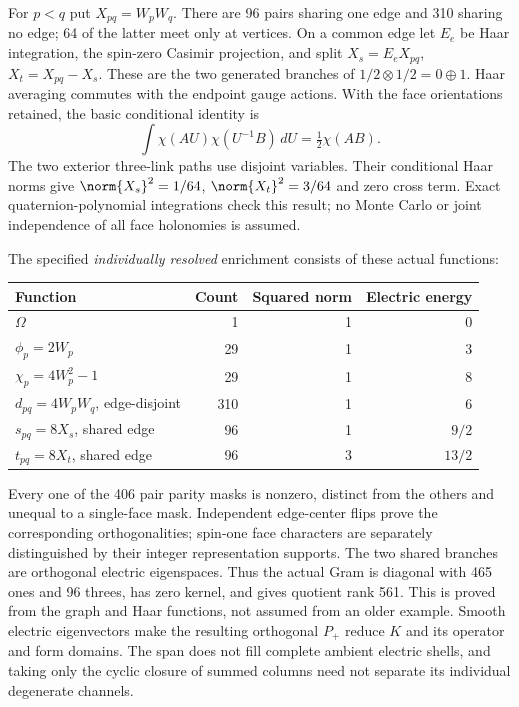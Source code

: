 For $p<q$ put $X_{pq}=W_pW_q$. There are 96 pairs sharing one edge and 310 sharing no edge; 64 of the latter meet only at vertices. On a common edge let $E_e$ be Haar integration, the spin-zero Casimir projection, and split $X_s=E_eX_{pq}$, $X_t=X_{pq}-X_s$. These are the two generated branches of $1/2\otimes1/2=0\oplus1$. Haar averaging commutes with the endpoint gauge actions. With the face orientations retained, the basic conditional identity is
\begin{equation}
 \int\chi(AU)\chi(U^{-1}B)\,dU=\tfrac12\chi(AB).
 \label{r28:eq:ah1-haar}
\end{equation}
The two exterior three-link paths use disjoint variables. Their conditional Haar norms give $\norm{X_s}^2=1/64$, $\norm{X_t}^2=3/64$ and zero cross term. Exact quaternion-polynomial integrations check this result; no Monte Carlo or joint independence of all face holonomies is assumed.

The specified \emph{individually resolved} enrichment consists of these actual functions:
\begin{center}\small
\begin{tabular}{@{}lrrr@{}}\toprule
Function & Count & Squared norm & Electric energy\\\midrule
$\Omega$&1&1&0\\
$\phi_p=2W_p$&29&1&3\\
$\chi_p=4W_p^2-1$&29&1&8\\
$d_{pq}=4W_pW_q$, edge-disjoint&310&1&6\\
$s_{pq}=8X_s$, shared edge&96&1&$9/2$\\
$t_{pq}=8X_t$, shared edge&96&3&$13/2$\\\bottomrule
\end{tabular}
\end{center}
Every one of the 406 pair parity masks is nonzero, distinct from the others and unequal to a single-face mask. Independent edge-center flips prove the corresponding orthogonalities; spin-one face characters are separately distinguished by their integer representation supports. The two shared branches are orthogonal electric eigenspaces. Thus the actual Gram is diagonal with 465 ones and 96 threes, has zero kernel, and gives quotient rank 561. This is proved from the graph and Haar functions, not assumed from an older example. Smooth electric eigenvectors make the resulting orthogonal $P_+$ reduce $K$ and its operator and form domains. The span does not fill complete ambient electric shells, and taking only the cyclic closure of summed columns need not separate its individual degenerate channels.

